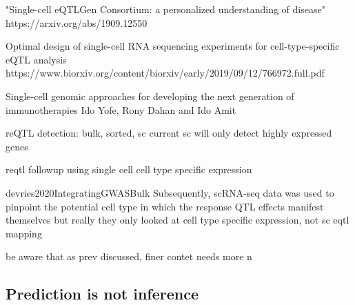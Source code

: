 \begin{outline}
        "Single-cell eQTLGen Consortium: a personalized understanding of disease"
        https://arxiv.org/abs/1909.12550

        Optimal design of single-cell RNA sequencing experiments for cell-type-specific eQTL analysis
        https://www.biorxiv.org/content/biorxiv/early/2019/09/12/766972.full.pdf

        Single-cell genomic approaches for developing the next generation of immunotherapies Ido Yofe, Rony Dahan and Ido Amit


        reQTL detection: bulk, sorted, sc
        current sc will only detect highly expressed genes

        reqtl followup using single cell cell type specific expression

        devries2020IntegratingGWASBulk
        Subsequently, scRNA-seq data was used to pinpoint the potential cell type in which the response QTL effects manifest themselves
            but really they only looked at cell type specific expression, not sc eqtl mapping

    be aware that as prev discussed, finer contet needs more n

%
%
%

\subsection{Prediction is not inference}


\end{outline}
